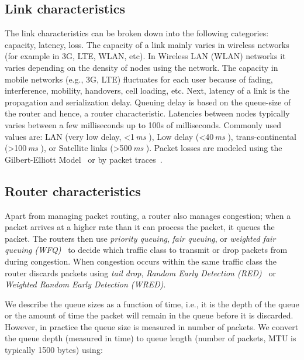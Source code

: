



\subsection{Link characteristics}

The link characteristics can be broken down into the following categories:
capacity, latency, loss. The capacity of a link mainly varies in wireless
networks (for example in 3G, LTE, WLAN, etc). In Wireless LAN (WLAN) networks
it varies depending on the density of nodes using the network. The capacity in
mobile networks (e.g., 3G, LTE) fluctuates for each user because of fading,
interference, mobility, handovers, cell loading, etc. Next, latency of a link
is the propagation and serialization delay. Queuing delay is based on the
queue-size of the router and hence, a router characteristic. Latencies between
nodes typically varies between a few milliseconds up to 100s of milliseconds.
Commonly used values are: LAN (very low delay, <1\,\emph{ms} ), Low delay
(<40\,\emph{ms} ), trans-continental (>100\,\emph{ms} ), or Satellite links
(>500\,\emph{ms} ). Packet losses are modeled using the Gilbert-Elliott
Model~\cite{gilbert1960capacity, elliott1963estimates} or by packet
traces~\cite{ellis:2011:dataset, 3gppSim}.


\subsection{Router characteristics}


Apart from managing packet routing, a router also manages congestion; when a
packet arrives at a higher rate than it can process the packet, it queues the
packet. The routers then use \emph{priority queuing}, \emph{fair queuing}, or
\emph{weighted fair queuing (WFQ)}~\cite{rfc4594} to decide which traffic
class to transmit or drop packets from during congestion. When congestion
occurs within the same traffic class the router discards packets using
\emph{tail drop}, \emph{Random Early Detection (RED)}~\cite{Floyd:RED} or
\emph{Weighted Random Early Detection (WRED)}.

We describe the queue sizes as a function of time, i.e., it is the depth of
the queue or the amount of time the packet will remain in the queue before it
is discarded. However, in practice the queue size is measured in number of
packets. We convert the queue depth (measured in time) to queue length (number
of packets, MTU is typically 1500 bytes) using:

